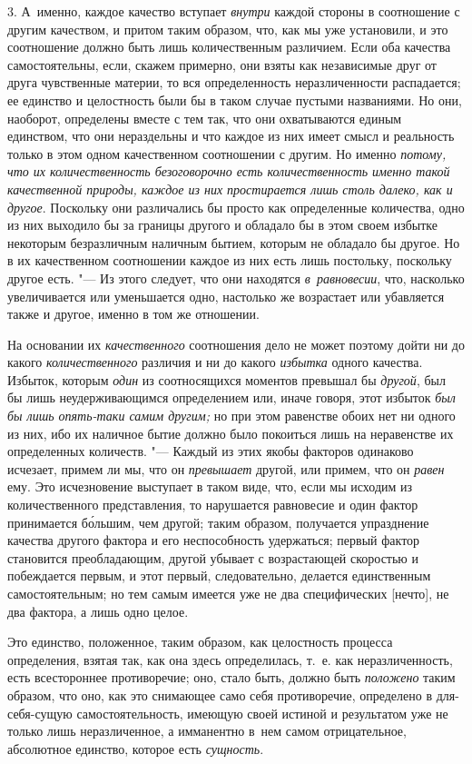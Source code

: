 3. А~именно, каждое качество вступает {\em внутри} каждой стороны в соотношение
с другим качеством, и притом таким образом, что, как мы уже установили, и это
соотношение должно быть лишь количественным различием. Если оба качества
самостоятельны, если, скажем примерно, они взяты как независимые друг от друга
чувственные материи, то вся определенность неразличенности распадается; ее
единство и целостность были бы в таком случае пустыми названиями. Но они,
наоборот, определены вместе с тем так, что они охватываются единым единством,
что они нераздельны и что каждое из них имеет смысл и реальность только в этом
одном качественном соотношении с другим. Но именно {\em потому, что их
количественность безоговорочно есть количественность именно такой качественной
природы, каждое из них простирается лишь столь далеко, как и другое}. Поскольку
они различались бы просто как определенные количества, одно из них выходило бы
за границы другого и обладало бы в этом своем избытке некоторым безразличным
наличным бытием, которым не обладало бы другое. Но в их качественном
соотношении каждое из них есть лишь постольку, поскольку другое есть. "--- Из
этого следует, что они находятся {\em в~равновесии}, что, насколько
увеличивается или уменьшается одно, настолько же возрастает или убавляется
также и другое, именно в том же отношении.

На основании их {\em качественного} соотношения дело не может поэтому дойти ни
до какого {\em количественного} различия и ни до какого {\em избытка} одного
качества. Избыток, которым {\em один} из соотносящихся моментов превышал бы
{\em другой}, был бы лишь неудерживающимся определением или, иначе говоря, этот
избыток {\em был бы лишь опять-таки самим другим;} но при этом равенстве обоих
нет ни одного из них, ибо их наличное бытие должно было покоиться лишь на
неравенстве их определенных количеств. "--- Каждый из этих якобы факторов
одинаково исчезает, примем ли мы, что он {\em превышает} другой, или примем,
что он {\em равен} ему. Это исчезновение выступает в таком виде, что, если мы
исходим из количественного представления, то нарушается равновесие и один
фактор принимается б\'{о}льшим, чем другой; таким образом, получается
упразднение качества другого фактора и его неспособность удержаться; первый
фактор становится преобладающим, другой убывает с возрастающей скоростью и
побеждается первым, и этот первый, следовательно, делается единственным
самостоятельным; но тем самым имеется уже не два специфических [нечто], не два
фактора, а лишь одно целое.

Это единство, положенное, таким образом, как целостность процесса определения,
взятая так, как она здесь определилась, т.~е. как неразличенность, есть
всестороннее противоречие; оно, стало быть, должно быть {\em положено} таким
образом, что оно, как это снимающее само себя противоречие, определено в
для-себя-сущую самостоятельность, имеющую своей истиной и результатом уже не
только лишь неразличенное, а имманентно в~нем самом отрицательное, абсолютное
единство, которое есть {\em сущность}.

